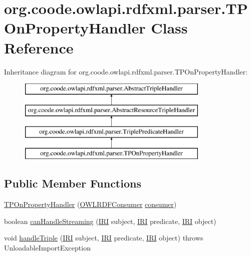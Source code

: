 \hypertarget{classorg_1_1coode_1_1owlapi_1_1rdfxml_1_1parser_1_1_t_p_on_property_handler}{\section{org.\-coode.\-owlapi.\-rdfxml.\-parser.\-T\-P\-On\-Property\-Handler Class Reference}
\label{classorg_1_1coode_1_1owlapi_1_1rdfxml_1_1parser_1_1_t_p_on_property_handler}
}
Inheritance diagram for org.\-coode.\-owlapi.\-rdfxml.\-parser.\-T\-P\-On\-Property\-Handler\-:\begin{figure}[H]
\begin{center}
\leavevmode
\includegraphics[height=4.000000cm]{classorg_1_1coode_1_1owlapi_1_1rdfxml_1_1parser_1_1_t_p_on_property_handler}
\end{center}
\end{figure}
\subsection*{Public Member Functions}
\begin{DoxyCompactItemize}
\item 
\hyperlink{classorg_1_1coode_1_1owlapi_1_1rdfxml_1_1parser_1_1_t_p_on_property_handler_a7362b8659a12414498824e31f93a74b0}{T\-P\-On\-Property\-Handler} (\hyperlink{classorg_1_1coode_1_1owlapi_1_1rdfxml_1_1parser_1_1_o_w_l_r_d_f_consumer}{O\-W\-L\-R\-D\-F\-Consumer} \hyperlink{classorg_1_1coode_1_1owlapi_1_1rdfxml_1_1parser_1_1_abstract_triple_handler_a4ccf4d898ff01eb1cadfa04b23d54e9c}{consumer})
\item 
boolean \hyperlink{classorg_1_1coode_1_1owlapi_1_1rdfxml_1_1parser_1_1_t_p_on_property_handler_a8bf41d2d2cb3d5da7d921983f858cd14}{can\-Handle\-Streaming} (\hyperlink{classorg_1_1semanticweb_1_1owlapi_1_1model_1_1_i_r_i}{I\-R\-I} subject, \hyperlink{classorg_1_1semanticweb_1_1owlapi_1_1model_1_1_i_r_i}{I\-R\-I} predicate, \hyperlink{classorg_1_1semanticweb_1_1owlapi_1_1model_1_1_i_r_i}{I\-R\-I} object)
\item 
void \hyperlink{classorg_1_1coode_1_1owlapi_1_1rdfxml_1_1parser_1_1_t_p_on_property_handler_a280592feb401281d9f132329c1ffa07f}{handle\-Triple} (\hyperlink{classorg_1_1semanticweb_1_1owlapi_1_1model_1_1_i_r_i}{I\-R\-I} subject, \hyperlink{classorg_1_1semanticweb_1_1owlapi_1_1model_1_1_i_r_i}{I\-R\-I} predicate, \hyperlink{classorg_1_1semanticweb_1_1owlapi_1_1model_1_1_i_r_i}{I\-R\-I} object)  throws Unloadable\-Import\-Exception 
\end{DoxyCompactItemize}
